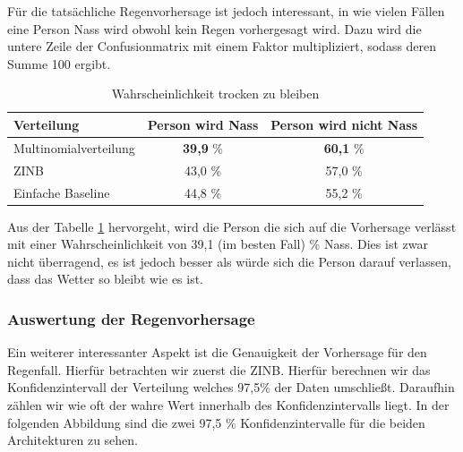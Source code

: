 \noindent Für die tatsächliche Regenvorhersage ist jedoch interessant, in wie vielen Fällen eine Person Nass wird obwohl kein Regen vorhergesagt wird.
Dazu wird die untere Zeile der Confusionmatrix mit einem Faktor multipliziert, sodass deren Summe 100 ergibt.\\
\begin{table}[h]
\begin{tabular}[h]{l|c|c}
Verteilung & Person wird Nass & Person wird nicht Nass  \\
\hline
Multinomialverteilung & \textbf{39,9} \% & \textbf{60,1} \%  \\
ZINB &43,0 \% & 57,0 \%  \\
Einfache Baseline & 44,8 \% & 55,2 \% 
\end{tabular}
\caption{Wahrscheinlichkeit trocken zu bleiben\label{tab:nass}}
\end{table}

\noindent Aus der Tabelle \ref{tab:nass} hervorgeht, wird die Person die sich auf die Vorhersage verlässt mit einer Wahrscheinlichkeit von 39,1 (im besten Fall) \% Nass.
Dies ist zwar nicht überragend, es ist jedoch besser als würde sich die Person darauf verlassen, dass das Wetter so bleibt wie es ist.

\newpage
\subsubsection{Auswertung der Regenvorhersage}
\noindent Ein weiterer interessanter Aspekt ist die Genauigkeit der Vorhersage für den Regenfall. Hierfür betrachten wir zuerst die ZINB.
Hierfür berechnen wir das Konfidenzintervall der Verteilung welches 97,5\% der Daten umschließt. Daraufhin zählen wir wie oft der wahre Wert innerhalb des Konfidenzintervalls liegt.
In der folgenden Abbildung sind die zwei 97,5 \% Konfidenzintervalle für die beiden Architekturen zu sehen.\\

